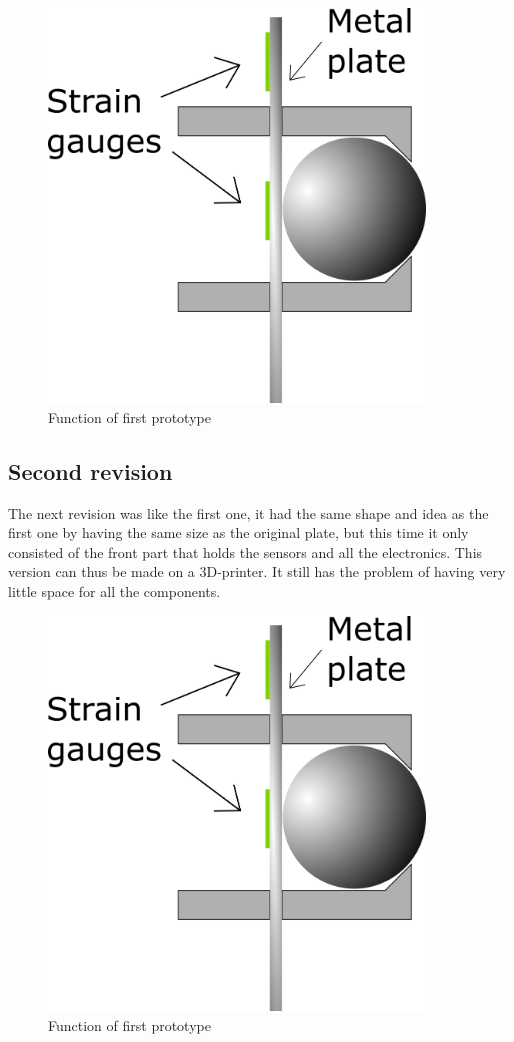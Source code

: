 \begin{figure}[H]
\begin{center}
	\includegraphics[width = 10cm]{Figures/Press_sens_func_1.png}
	\caption{Function of first prototype}
	\label{Press_sens_prot_1}
\end{center}
\end{figure}

\subsection{Second revision}
The next revision was like the first one, it had the same shape and idea as the first one by having the same size as the original plate, but this time it only consisted of the front part that holds the sensors and all the electronics. This version can thus be made on a 3D-printer. It still has the problem of having very little space for all the components.    

\begin{figure}[H]
\begin{center}
	\includegraphics[width = 10cm]{Figures/Press_sens_func_1.png}
	\caption{Function of first prototype}
	\label{Press_sens_prot_1}
\end{center}
\end{figure}

